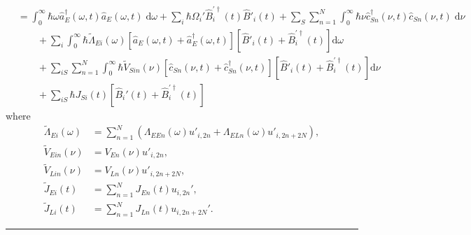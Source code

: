 \documentclass{article}
\begin{document}
\begin{equation}
\begin{split}
&= \int_0^\infty\hbar\omega\hat{a}_E^\dagger(\omega,t)\hat{a}_E(\omega,t)\;\mathrm{d}\omega + \sum_i\hbar\Omega_i'\hat{B}_i^{\prime\dagger}(t)\hat{B}'_i(t) + \sum_{S}\sum_{n = 1}^N\int_0^\infty\hbar\nu\hat{c}_{Sn}^\dagger(\nu,t)\hat{c}_{Sn}(\nu,t)\;\mathrm{d}\nu\\
&\qquad + \sum_i\int_0^\infty\hbar\tilde{\Lambda}_{Ei}(\omega)\left[\hat{a}_E(\omega,t) + \hat{a}_E^\dagger(\omega,t)\right]\left[\hat{B}'_i(t) + \hat{B}_i^{\prime\dagger}(t)\right]\mathrm{d}\omega\\
&\qquad + \sum_{iS}\sum_{n = 1}^{N}\int_0^\infty\hbar\tilde{V}_{Sin}(\nu)\left[\hat{c}_{Sn}(\nu,t) + \hat{c}_{Sn}^\dagger(\nu,t)\right]\left[\hat{B}'_i(t) + \hat{B}_i^{\prime\dagger}(t)\right]\mathrm{d}\nu\\
&\qquad + \sum_{iS}\hbar J_{Si}(t)\left[\hat{B}_i'(t) + \hat{B}_i^{\prime\dagger}(t)\right]
\end{split}
\end{equation}
where
\begin{equation}
\begin{split}
\tilde{\Lambda}_{Ei}(\omega) 
&= \sum_{n = 1}^N\left(\Lambda_{EEn}(\omega)u'_{i,2n} + \Lambda_{ELn}(\omega)u'_{i,2n+2N}\right),\\
\tilde{V}_{Ein}(\nu) &= V_{En}(\nu)u'_{i,2n},\\
\tilde{V}_{Lin}(\nu) &= V_{Ln}(\nu)u'_{i,2n + 2N},\\
\tilde{J}_{Ei}(t) &= \sum_{n=1}^NJ_{En}(t)u_{i,2n}',\\
\tilde{J}_{Li}(t) &= \sum_{n=1}^NJ_{Ln}(t)u_{i,2n+2N}'.
\end{split}
\end{equation}

\noindent\rule{\textwidth}{0.5pt}\\
\end{document}
